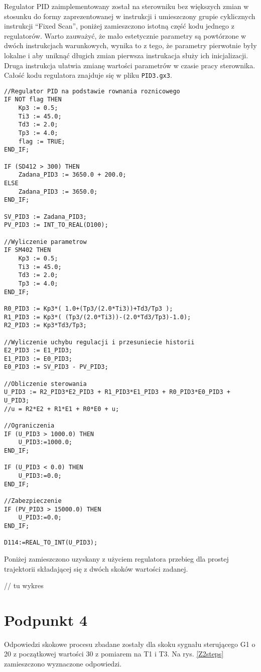 Regulator PID zaimplementowany został na sterowniku bez większych zmian w stosunku do formy zaprezentowanej w instrukcji i umieszczony grupie cyklicznych instrukcji ``Fixed Scan'', poniżej zamieszczono istotną część kodu jednego z regulatorów. Warto zauważyć, że mało estetycznie parametry są powtórzone w dwóch instrukcjach warunkowych, wynika to z tego, że parametry pierwotnie były lokalne i aby uniknąć długich zmian pierwsza instrukacja służy ich inicjalizacji. Druga instrukcja ułatwia zmianę wartości parametrów w czasie pracy sterownika. Całość kodu regulatora znajduje się w pliku \verb+PID3.gx3+.

\begin{lstlisting}
//Regulator PID na podstawie rownania roznicowego
IF NOT flag THEN
    Kp3 := 0.5;
    Ti3 := 45.0;
    Td3 := 2.0;
    Tp3 := 4.0;
    flag := TRUE;
END_IF;

IF (SD412 > 300) THEN
    Zadana_PID3 := 3650.0 + 200.0;
ELSE
    Zadana_PID3 := 3650.0;
END_IF;

SV_PID3 := Zadana_PID3;
PV_PID3 := INT_TO_REAL(D100);

//Wyliczenie parametrow
IF SM402 THEN
    Kp3 := 0.5;
    Ti3 := 45.0;
    Td3 := 2.0;
    Tp3 := 4.0;
END_IF;

R0_PID3 := Kp3*( 1.0+(Tp3/(2.0*Ti3))+Td3/Tp3 );
R1_PID3 := Kp3*( (Tp3/(2.0*Ti3))-(2.0*Td3/Tp3)-1.0);
R2_PID3 := Kp3*Td3/Tp3;

//Wyliczenie uchybu regulacji i przesuniecie historii
E2_PID3 := E1_PID3;
E1_PID3 := E0_PID3;
E0_PID3 := SV_PID3 - PV_PID3;

//Obliczenie sterowania
U_PID3 := R2_PID3*E2_PID3 + R1_PID3*E1_PID3 + R0_PID3*E0_PID3 + U_PID3;
//u = R2*E2 + R1*E1 + R0*E0 + u;

//Ograniczenia
IF (U_PID3 > 1000.0) THEN
    U_PID3:=1000.0;
END_IF;

IF (U_PID3 < 0.0) THEN
    U_PID3:=0.0;
END_IF;

//Zabezpieczenie
IF (PV_PID3 > 15000.0) THEN
    U_PID3:=0.0;
END_IF;

D114:=REAL_TO_INT(U_PID3);
\end{lstlisting}

Poniżej zamieszczono uzyskany z użyciem regulatora przebieg dla prostej trajektorii składającej się z dwóch skoków wartości zadanej.

// tu wykres


\chapter{Podpunkt 4}
Odpowiedzi skokowe procesu zbadane zostały dla skoku sygnału sterującego G1 o 20 z początkowej wartości 30 z pomiarem na T1 i T3. Na rys. \ref{Z2steps} zamieszczono wyznaczone odpowiedzi.

